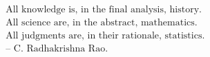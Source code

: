 \begin{align*}
&\mbox{All knowledge is, in the final analysis, history.}\\
&\mbox{All science are, in the abstract, mathematics.}\\
&\mbox{All judgments are, in their rationale, statistics. }\\
&\mbox{-- C. Radhakrishna Rao.}
\end{align*}